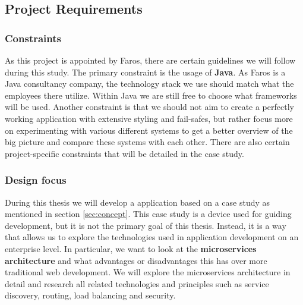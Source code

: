 \documentclass[12pt]{article}
\begin{document}
\begin{multicols}{2}
\subsection{Project Requirements}
\subsubsection{Constraints}\label{sec:constraints}
As this project is appointed by Faros, there are certain guidelines we will follow during this study. The primary constraint is the usage of \textbf{Java}. As Faros is a Java consultancy company, the technology stack we use should match what the employees there utilize. Within Java we are still free to choose what frameworks will be used. Another constraint is that we should not aim to create a perfectly working application with extensive styling and fail-safes, but rather focus more on experimenting with various different systems to get a better overview of the big picture and compare these systems with each other. There are also certain project-specific constraints that will be detailed in the case study.
\subsubsection{Design focus}
During this thesis we will develop a application based on a case study as mentioned in section \ref{sec:concept}. This case study is a device used for guiding development, but it is not the primary goal of this thesis. Instead, it is a way that allows us to explore the technologies used in application development on an enterprise level. In particular, we want to look at the \textbf{microservices architecture} and what advantages or disadvantages this has over more traditional web development. We will explore the microservices architecture in detail and research all related technologies and principles such as service discovery, routing, load balancing and security.

\end{multicols}

\end{document}
